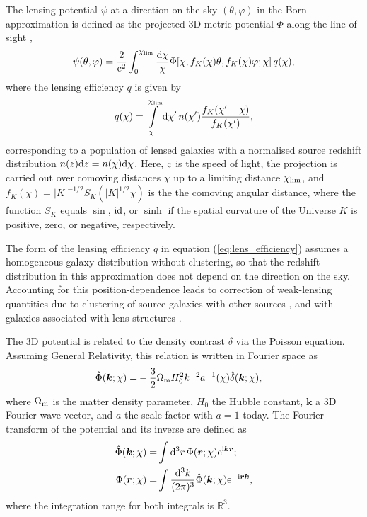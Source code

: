 \documentclass[fleqn,usenatbib]{mnras} %
\renewcommand{\vec}{\bm}
\begin{document}
The lensing potential $\psi$ at a direction on the sky $(\theta, \varphi)$ in
the Born approximation is defined as the projected 3D metric potential $\Phi$
along the line of sight \citep{1998ApJ...498...26K,BS01},
%
%
\begin{equation}
  \psi(\theta, \varphi) = \frac 2 {{\rm c}^2} \int_0^{\chi_{\rm lim}} \frac{{\rm d}\chi}{\chi}
    \Phi[\chi, f_K(\chi) \theta, f_K(\chi) \varphi; \chi] \, q(\chi),
  \label{eq:psi}
\end{equation}
%
where the lensing efficiency $q$ is given by
%
\begin{equation}
  q(\chi) = \int\limits_\chi^{\chi_{\rm lim}} {\rm d} \chi^\prime \, n(\chi^\prime)
    \frac{f_K(\chi^\prime - \chi)}{f_K(\chi^\prime)},
  \label{eq:lens_efficiency}
\end{equation}
%
corresponding to a population of lensed galaxies with a normalised source
redshift distribution $n(z) {\rm d}z = n(\chi) {\rm d} \chi$. Here, ${\rm c}$
is the speed of light, the projection is carried out over comoving distances
$\chi$ up to a limiting distance $\chi_{\rm lim}$, and $f_K(\chi) = |K|^{-1/2}
S_K(|K|^{1/2} \chi)$ is the the comoving angular distance, where the function
$S_K$ equals $\sin$, ${\rm id}$, or $\sinh$ if the spatial curvature of the Universe
$K$ is positive, zero, or negative, respectively.

The form of the lensing efficiency $q$ in equation (\ref{eq:lens_efficiency}) assumes a
homogeneous galaxy distribution without clustering, so that the redshift
distribution in this approximation does not depend on the direction on the sky.
Accounting for this position-dependence leads to correction of weak-lensing
quantities due to clustering of source galaxies with other sources
\citep{2002A&A...389..729S}, and with galaxies associated with lens structures
\citep{1998A&A...338..375B,H02}.

The 3D potential is related to the density contrast $\delta$ via the Poisson
equation. Assuming General Relativity, this relation is written in Fourier space as
%
\begin{align}
  \hat \Phi(\vec k; \chi) = & - \frac 3 2 \Omega_{\rm m} H_0^2 k^{-2} a^{-1}(\chi) \hat \delta(\vec k; \chi),
      \label{eq:poisson}
\end{align}
%
where $\Omega_{\rm m}$ is the matter density parameter, $H_0$ the Hubble constant, $\vec k$ a 3D Fourier wave
vector, and $a$ the scale factor with $a=1$ today.
The Fourier transform of the potential and its inverse are defined as
%
\begin{align}
  \hat \Phi(\vec k; \chi) = &  \int {\rm d}^3 r \, \Phi(\vec r; \chi) {\rm e}^{{\rm i} \vec k \vec r} ;
  \label{eq:hatPhi}
  \\
  \Phi(\vec r; \chi) = &  \int \frac{{\rm d}^3 k}{(2\pi)^3}
      \hat \Phi(\vec k; \chi) {\rm e}^{-{\rm i} \vec r \vec k},
  \label{eq:hatPhi_inv}
\end{align}
%
where the integration range for both integrals is $\mathbb{R}^3$.
\end{document}
